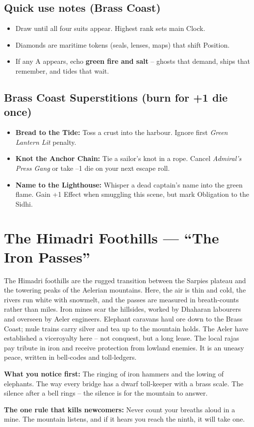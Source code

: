 \documentclass[11pt]{book}
\begin{document}
\subsection*{Quick use notes (Brass Coast)}
\begin{itemize}
\item Draw until all four suits appear. Highest rank sets main Clock.
\item Diamonds are maritime tokens (seals, lenses, maps) that shift Position.
\item If any A appears, echo \textbf{green fire and salt} – ghosts that demand, ships that remember, and tides that wait.
\end{itemize}

\subsection*{Brass Coast Superstitions (burn for +1 die once)}
\begin{itemize}
\item \textbf{Bread to the Tide:} Toss a crust into the harbour. Ignore first \textit{Green Lantern Lit} penalty.
\item \textbf{Knot the Anchor Chain:} Tie a sailor’s knot in a rope. Cancel \textit{Admiral’s Press Gang} or take –1 die on your next escape roll.
\item \textbf{Name to the Lighthouse:} Whisper a dead captain’s name into the green flame. Gain +1 Effect when smuggling this scene, but mark Obligation to the Sidhi.
\end{itemize}

\section{The Himadri Foothills — ``The Iron Passes''}
\label{sec:himadri}

\begin{tcolorbox}[colback=black!3,colframe=blue!60!black,title={Theme \& Atmosphere (Himadri Foothills)}]
The Himadri foothills are the rugged transition between the Sarpies plateau and the towering peaks of the Aelerian mountains. Here, the air is thin and cold, the rivers run white with snowmelt, and the passes are measured in breath‑counts rather than miles. Iron mines scar the hillsides, worked by Dhaharan labourers and overseen by Aeler engineers. Elephant caravans haul ore down to the Brass Coast; mule trains carry silver and tea up to the mountain holds. The Aeler have established a viceroyalty here – not conquest, but a long lease. The local rajas pay tribute in iron and receive protection from lowland enemies. It is an uneasy peace, written in bell‑codes and toll‑ledgers.

\vspace{2mm}
\textbf{What you notice first:} The ringing of iron hammers and the lowing of elephants. The way every bridge has a dwarf toll‑keeper with a brass scale. The silence after a bell rings – the silence is for the mountain to answer.

\textbf{The one rule that kills newcomers:} Never count your breaths aloud in a mine. The mountain listens, and if it hears you reach the ninth, it will take one.
\end{tcolorbox}
\end{document}

